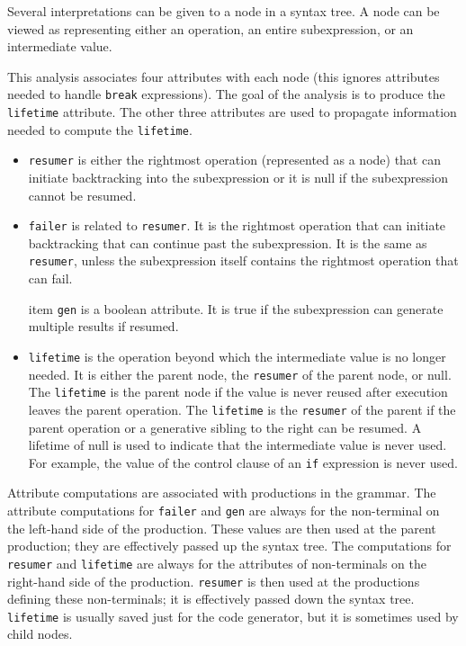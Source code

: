 Several interpretations can be given to a node in a syntax tree. A
node can be viewed as representing either an operation, an entire
subexpression, or an intermediate value.

This analysis associates four attributes with each node (this ignores
attributes needed to handle \texttt{break} expressions).  The goal of
the analysis is to produce the \texttt{lifetime} attribute. The other
three attributes are used to propagate information needed to compute
the \texttt{lifetime}.

\liststyleLxix
\begin{itemize}

\item \texttt{resumer} is either the rightmost operation (represented
as a node) that can initiate backtracking into the subexpression or it
is null if the subexpression cannot be resumed.

\item \texttt{failer} is related to \texttt{resumer}. It is the
rightmost operation that can initiate backtracking that can continue
past the subexpression. It is the same as \texttt{resumer}, unless the
subexpression itself contains the rightmost operation that can fail.

item \texttt{gen} is a boolean attribute. It is true if the
subexpression can generate multiple results if resumed.

\item \texttt{lifetime} is the operation beyond which the intermediate
value is no longer needed. It is either the parent node, the
\texttt{resumer} of the parent node, or null. The \texttt{lifetime} is
the parent node if the value is never reused after execution leaves
the parent operation. The \texttt{lifetime} is the \texttt{resumer} of
the parent if the parent operation or a generative sibling to the
right can be resumed. A lifetime of null is used to indicate that the
intermediate value is never used. For example, the value of the
control clause of an \texttt{if} expression is never used.

\end{itemize}

Attribute computations are associated with productions in the
grammar. The attribute computations for \texttt{failer} and
\texttt{gen} are always for the non-terminal on the left-hand side of
the production. These values are then used at the parent production;
they are effectively passed up the syntax tree. The computations for
\texttt{resumer} and \texttt{lifetime} are always for the attributes
of non-terminals on the right-hand side of the
production. \texttt{resumer} is then used at the productions defining
these non-terminals; it is effectively passed down the syntax
tree. \texttt{lifetime} is usually saved just for the code generator,
but it is sometimes used by child nodes.


